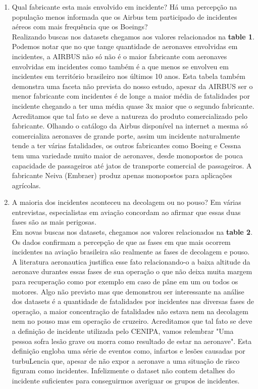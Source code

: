 \documentclass[conference]{IEEEtran}
\begin{document}
\begin{enumerate}
 \item Qual fabricante esta mais envolvido em incidente? Há uma percepção na população menos informada que os Airbus tem participado de incidentes aéreos com mais frequência
 que os Boeings?\\
 
 Realizando buscas nos datasets chegamos aos valores relacionados na \textbf{table 1}. Podemos notar que no que tange quantidade de aeronaves envolvidas em incidentes,
 a AIRBUS não só não é o maior fabricante com aeronaves envolvidas em incidentes como também é a que menos se envolveu em incidentes em território brasileiro nos últimos
 10 anos. Esta tabela também demonstra uma faceta não prevista do nosso estudo, apesar da AIRBUS ser o menor fabricante com incidentes é de longe a maior média de fatalidades 
 por incidente chegando a ter uma média quase 3x maior que o segundo fabricante. Acreditamos que tal fato se deve a natureza do produto comercializado pelo fabricante. 
 Olhando o catálogo da Airbus disponível na internet a mesma só comercializa aeronaves de grande porte, assim um incidente naturalmente tende a ter várias fatalidades,
 os outros fabricantes como Boeing e Cessna tem uma variedade muito maior de aeronaves, desde monopostos de pouca capacidade de passageiros até jatos de transporte comercial
 de passageiros. A fabricante Neiva (Embraer) produz apenas monopostos para aplicações agrícolas.\\
 
 \item A maioria dos incidentes aconteceu na decolagem ou no pouso? Em várias entrevistas, especialistas em aviação concordam ao afirmar que essas duas fases são as
 mais perigosas.\\
 
 Em novas buscas nos datasets, chegamos aos valores relacionados na \textbf{table 2}. Os dados confirmam a percepção de que as fases em que mais ocorrem incidentes na
 aviação brasileira são realmente as fases de decolagem e pouso. A literatura aeronautica justifica esse fato relacionando-o a baixa altitude da aeronave durantes essas
 fases de sua operação o que não deixa muita margem para recuperação como por exemplo em caso de pâne em um ou todos os motores. Algo não previsto mas que demonstrou ser
 interessante na análise dos datasets é a quantidade de fatalidades por incidentes nas diversas fases de operação, a maior concentração de fatalidades não estava nem na
 decolagem nem no pouso mas em operação de cruzeiro. Acreditamos que tal fato se deve a definição de incidente utilizada pelo CENIPA, vamos relembrar "Uma pessoa sofra 
 lesão grave ou morra como resultado de estar na aeronave". Esta definição engloba uma série de eventos como, infartos e lesões causadas por turbuLencia que, apesar de não
 expor a aeronave a uma situação de risco figuram como incidentes. Infelizmente o dataset não contem detalhes do incidente suficientes para conseguirmos averiguar os
 grupos de incidentes.\\
 

\end{enumerate}
\end{document}
